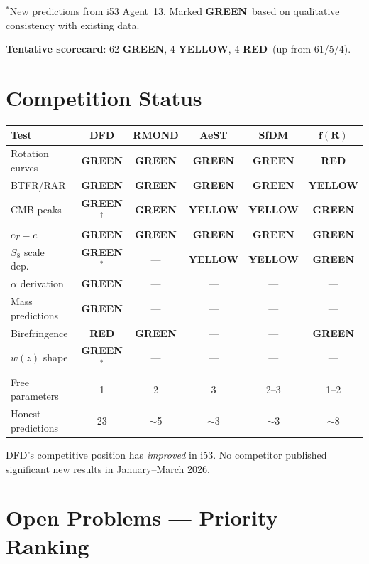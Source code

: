 \documentclass[11pt,a4paper]{article}
\newcommand{\GREEN}{\textcolor{dfdgreen}{\textbf{GREEN}}}
\newcommand{\YELLOW}{\textcolor{dfdyellow}{\textbf{YELLOW}}}
\newcommand{\RED}{\textcolor{dfdred}{\textbf{RED}}}
\begin{document}
$^*$New predictions from i53 Agent~13. Marked \GREEN\ based on qualitative consistency with existing data.

\textbf{Tentative scorecard}: 62 \GREEN, 4 \YELLOW, 4 \RED\ (up from 61/5/4).


\section{Competition Status}
\label{sec:competition}

\begin{center}
\begin{longtable}{p{3.5cm}ccccc}
\toprule
\textbf{Test} & \textbf{DFD} & \textbf{RMOND} & \textbf{AeST} & \textbf{SfDM} & $\mathbf{f(R)}$ \\
\midrule
Rotation curves & \GREEN & \GREEN & \GREEN & \GREEN & \RED \\
BTFR/RAR & \GREEN & \GREEN & \GREEN & \GREEN & \YELLOW \\
CMB peaks & \GREEN$^\dagger$ & \GREEN & \YELLOW & \YELLOW & \GREEN \\
$c_T = c$ & \GREEN & \GREEN & \GREEN & \GREEN & \GREEN \\
$S_8$ scale dep.\ & \GREEN$^*$ & --- & \YELLOW & \YELLOW & \GREEN \\
$\alpha$ derivation & \GREEN & --- & --- & --- & --- \\
Mass predictions & \GREEN & --- & --- & --- & --- \\
Birefringence & \RED & \GREEN & --- & --- & \GREEN \\
$w(z)$ shape & \GREEN$^*$ & --- & --- & --- & --- \\
Free parameters & 1 & 2 & 3 & 2--3 & 1--2 \\
Honest predictions & 23 & $\sim$5 & $\sim$3 & $\sim$3 & $\sim$8 \\
\bottomrule
\end{longtable}
\end{center}

DFD's competitive position has \emph{improved} in i53. No competitor published significant new results in January--March 2026.


\section{Open Problems --- Priority Ranking}
\label{sec:open}
\end{document}
